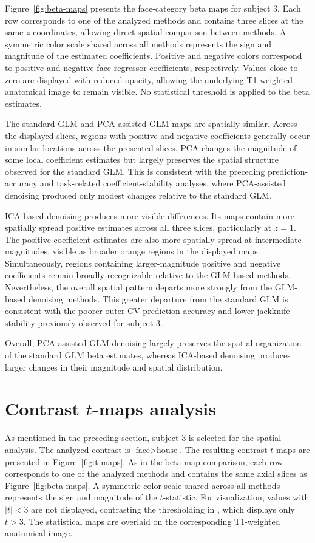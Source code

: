 \documentclass[english]{pwr_wmat_praca_dyplomowa}
\theoremstyle{definition}
\theoremstyle{remark}
\begin{document}
Figure~\ref{fig:beta-maps} presents the face-category beta maps for subject 3. Each row corresponds to one of the analyzed methods and contains three slices at the same $z$-coordinates, allowing direct spatial comparison between methods. A symmetric color scale shared across all methods represents the sign and magnitude of the estimated coefficients. Positive and negative colors correspond to positive and negative face-regressor coefficients, respectively. Values close to zero are displayed with reduced opacity, allowing the underlying T1-weighted anatomical image to remain visible. No statistical threshold is applied to the beta estimates.

The standard GLM and PCA-assisted GLM maps are spatially similar. Across the displayed slices, regions with positive and negative coefficients generally occur in similar locations across the presented slices. PCA changes the magnitude of some local coefficient estimates but largely preserves the spatial structure observed for the standard GLM. This is consistent with the preceding prediction-accuracy and task-related coefficient-stability analyses, where PCA-assisted denoising produced only modest changes relative to the standard GLM.

\newpage
ICA-based denoising produces more visible differences. Its maps contain more spatially spread positive estimates across all three slices, particularly at $z=1$. The positive coefficient estimates are also more spatially spread at intermediate magnitudes, visible as broader orange regions in the displayed maps. Simultaneously, regions containing larger-magnitude positive and negative coefficients remain broadly recognizable relative to the GLM-based methods. Nevertheless, the overall spatial pattern departs more strongly from the GLM-based denoising methods. This greater departure from the standard GLM is consistent with the poorer outer-CV prediction accuracy and lower jackknife stability previously observed for subject 3.

Overall, PCA-assisted GLM denoising largely preserves the spatial organization of the standard GLM beta estimates, whereas ICA-based denoising produces larger changes in their magnitude and spatial distribution.

\section{Contrast \texorpdfstring{$t$}{t}-maps analysis}

As mentioned in the preceding section, subject 3 is selected for the spatial analysis. The analyzed contrast is $\text{face} > \text{house}$. The resulting contrast $t$-maps are presented in Figure~\ref{fig:t-maps}. As in the beta-map comparison, each row corresponds to one of the analyzed methods and contains the same axial slices as Figure~\ref{fig:beta-maps}. A symmetric color scale shared across all methods represents the sign and magnitude of the $t$-statistic. For visualization, values with $|t| < 3$ are not displayed, contrasting the thresholding in \cite[Figure 5]{glm-denoise}, which displays only $t > 3$. The statistical maps are overlaid on the corresponding T1-weighted anatomical image.
\end{document}
